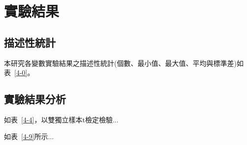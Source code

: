 \chapter{實驗結果}
\label{c:experiment}

\section{描述性統計}
本研究各變數實驗結果之描述性統計(個數、最小值、最大值、平均與標準差)如表~\ref{4-0}。




\section{實驗結果分析}

如表~\ref{4-4}，以雙獨立樣本t檢定檢驗...







如表~\ref{4-9}所示...






